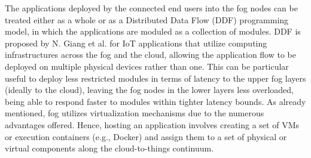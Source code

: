 \noindent\tab The applications deployed by the connected end users into the fog nodes can be treated either as a whole or as a Distributed Data Flow (DDF) programming model, in which the applications are moduled as a collection of modules. DDF is proposed by N. Giang et al. \cite{giang2015developing} for IoT applications that utilize computing infrastructures across the fog and the cloud, allowing the application flow to be deployed on multiple physical devices rather than one. This can be particular useful to deploy less restricted modules in terms of latency to the upper fog layers (ideally to the cloud), leaving the fog nodes in the lower layers less overloaded, being able to respond faster to modules within tighter latency bounds. As already mentioned, fog utilizes virtualization mechanisms due to the numerous advantages offered. Hence, hosting an application involves creating a set of VMs or execution containers (e.g., Docker) and assign them to a set of physical or virtual components along the cloud-to-things continuum.

